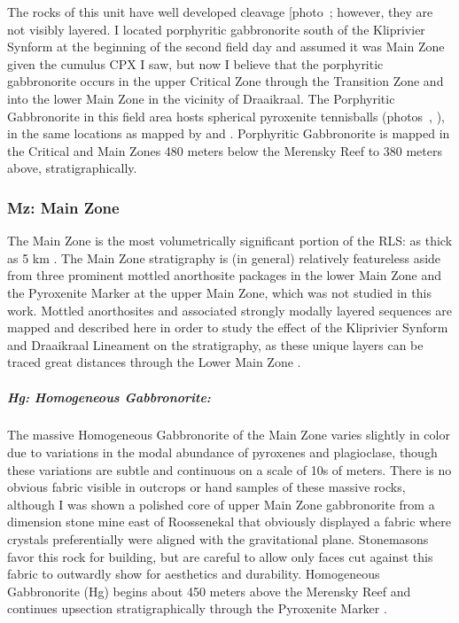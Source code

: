 The rocks of this unit have well developed cleavage {[}photo~\ChFivePhoto{63}{]};
however, they are not visibly layered. I located porphyritic
gabbronorite south of the Kliprivier Synform at the beginning of the
second field day and assumed it was Main Zone given the cumulus CPX I
saw, but now I believe that the porphyritic gabbronorite occurs in the
upper Critical Zone through the Transition Zone and into the lower Main
Zone in the vicinity of Draaikraal. The Porphyritic Gabbronorite in this
field area hosts spherical pyroxenite tennisballs (photos~, ), in
the same locations as mapped by \citet{harmer1985} and
\citet{mitchell2023}. Porphyritic Gabbronorite is mapped in the Critical and
Main Zones 480 meters below the Merensky Reef to 380 meters above,
stratigraphically.

\subsubsection{Mz: Main Zone}
\label{sec:ch5-zone-mz}

The Main Zone is the most volumetrically significant portion of the RLS:
as thick as 5 km \citep{latypovetal2022}. The Main Zone stratigraphy is
(in general) relatively featureless aside from three prominent mottled
anorthosite packages in the lower Main Zone and the Pyroxenite Marker at
the upper Main Zone, which was not studied in this work. Mottled
anorthosites and associated strongly modally layered sequences are
mapped and described here in order to study the effect of the Kliprivier
Synform and Draaikraal Lineament on the stratigraphy, as these unique
layers can be traced great distances through the Lower Main Zone
\citep{latypovetal2022}.

\subparagraph{Hg: Homogeneous Gabbronorite:}
\label{sec:ch5-unit-hg}

The massive Homogeneous Gabbronorite of the Main Zone varies slightly in
color due to variations in the modal abundance of pyroxenes and
plagioclase, though these variations are subtle and continuous on a
scale of 10s of meters. There is no obvious fabric visible in outcrops
or hand samples of these massive rocks, although I was shown a polished
core of upper Main Zone gabbronorite from a dimension stone mine east of
Roossenekal that obviously displayed a fabric where crystals
preferentially were aligned with the gravitational plane. Stonemasons
favor this rock for building, but are careful to allow only faces cut
against this fabric to outwardly show for aesthetics and durability.
Homogeneous Gabbronorite (Hg) begins about 450 meters above the Merensky
Reef and continues upsection stratigraphically through the Pyroxenite
Marker \citep{sacs1980,vongruenewaldt1985}.

